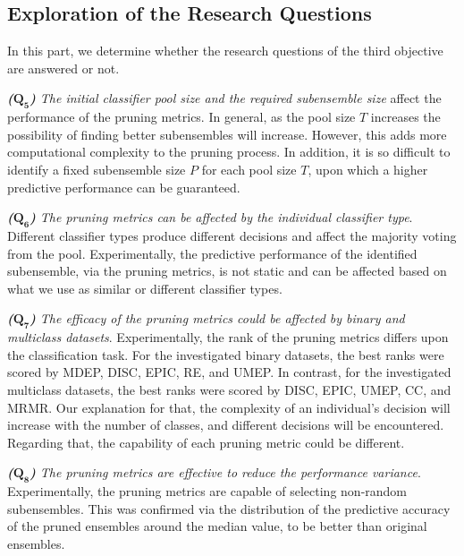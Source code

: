 %
%

\subsection{Exploration of the Research Questions}

In this part, we determine whether the research questions of the third objective are answered or not. 

\textit{\textbf{($\pmb{Q_5}$)} The initial classifier pool size and the required subensemble size} affect the performance of the pruning metrics. In general, as the pool size $T$ increases the possibility of finding better subensembles will increase. However, this adds more computational complexity to the pruning process. In addition, it is so difficult to identify a fixed subensemble size $P$ for each pool size $T$, upon which a higher predictive performance can be guaranteed. 

\textit{\textbf{($\pmb{Q_6}$)} The pruning metrics can be affected by the individual classifier type}. Different classifier types produce different decisions and affect the majority voting from the pool. Experimentally, the predictive performance of the identified subensemble, via the pruning metrics, is not static and can be affected based on what we use as similar or different classifier types.   

\textit{\textbf{($\pmb{Q_7}$)} The efficacy of the pruning metrics could be affected by binary and multiclass datasets}. Experimentally, the rank of the pruning metrics differs upon the classification task. For the investigated binary datasets, the best ranks were scored by MDEP, DISC, EPIC, RE, and UMEP. In contrast, for the investigated multiclass datasets, the best ranks were scored by DISC, EPIC, UMEP, CC, and MRMR. Our explanation for that, the complexity of an individual's decision will increase with the number of classes, and different decisions will be encountered. Regarding that, the capability of each pruning metric could be different.             

\textit{\textbf{($\pmb{Q_8}$)} The pruning metrics are effective to reduce the performance variance}. Experimentally, the pruning metrics are capable of selecting non-random subensembles. This was confirmed via the distribution of the predictive accuracy of the pruned ensembles around the median value, to be better than original ensembles.


